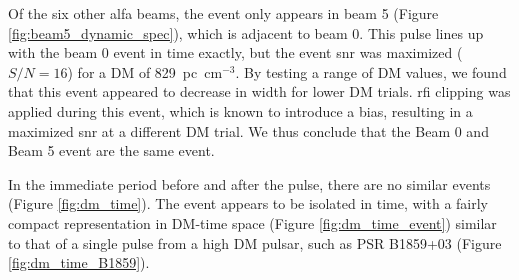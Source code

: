 \documentclass[a4paper,fleqn,usenatbib]{mnras}
\begin{document}
Of the six other \gls{alfa} beams, the event only appears in beam 5 (Figure
\ref{fig:beam5_dynamic_spec}), which is adjacent to beam 0.  This pulse lines up
with the beam 0 event in time exactly, but the event \gls{snr} was maximized
($S/N=16$) for a DM of 829~pc~cm$^{-3}$. By testing a range of DM values, we
found that this event appeared to decrease in width for lower DM trials.
\gls{rfi} clipping was applied during this event, which is known to introduce a
bias, resulting in a maximized \gls{snr} at a different DM trial.  We thus
conclude that the Beam 0 and Beam 5 event are the same event.

In the immediate period before and after the pulse, there are no similar events
(Figure \ref{fig:dm_time}). The event appears to be isolated in time, with a
fairly compact representation in DM-time space (Figure \ref{fig:dm_time_event})
similar to that of a single pulse from a high DM pulsar, such as PSR B1859+03
(Figure \ref{fig:dm_time_B1859}).
\end{document}
